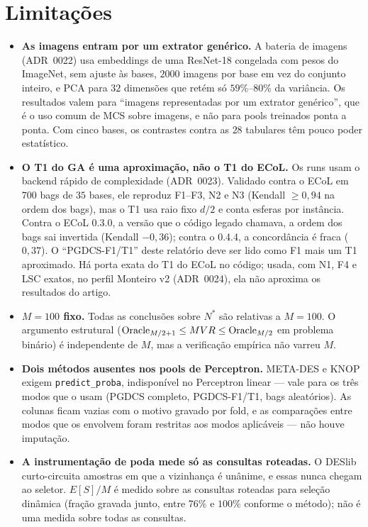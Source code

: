 \section{Limitações}

\begin{itemize}
\item \textbf{As imagens entram por um extrator genérico.} A bateria de imagens
(ADR~0022) usa embeddings de uma ResNet-18 congelada com pesos do ImageNet, sem
ajuste às bases, $2000$ imagens por base em vez do conjunto inteiro, e PCA para
$32$ dimensões que retém só $59\%$--$80\%$ da variância. Os resultados valem para
``imagens representadas por um extrator genérico'', que é o uso comum de MCS
sobre imagens, e não para pools treinados ponta a ponta. Com cinco bases, os
contrastes contra as $28$ tabulares têm pouco poder estatístico.

\item \textbf{O T1 do GA é uma aproximação, não o T1 do ECoL.} Os runs usam o
backend rápido de complexidade (ADR~0023). Validado contra o ECoL em $700$ bags
de $35$ bases, ele reproduz F1--F3, N2 e N3 (Kendall $\ge0{,}94$ na ordem dos
bags), mas o T1 usa raio fixo $d/2$ e conta esferas por instância. Contra o ECoL
0.3.0, a versão que o código legado chamava, a ordem dos bags sai invertida
(Kendall $-0{,}36$); contra o 0.4.4, a concordância é fraca ($0{,}37$). O
``PGDCS-F1/T1'' deste relatório deve ser lido como F1 mais um T1 aproximado. Há
porta exata do T1 do ECoL no código; usada, com N1, F4 e LSC exatos, no perfil
Monteiro v2 (ADR~0024), ela não aproxima os resultados do artigo.

\item \textbf{$M=100$ fixo.} Todas as conclusões sobre $N^{*}$ são relativas a
$M=100$. O argumento estrutural ($\text{Oracle}_{M/2+1}\le MVR\le\text{Oracle}_{M/2}$ em problema binário)
é independente de $M$, mas a verificação empírica não varreu $M$.

\item \textbf{Dois métodos ausentes nos pools de Perceptron.} META-DES e KNOP
exigem \texttt{predict\_proba}, indisponível no Perceptron linear --- vale para os
três modos que o usam (PGDCS completo, PGDCS-F1/T1, bags aleatórios). As colunas
ficam vazias com o motivo gravado por fold, e as comparações entre modos que os
envolvem foram restritas aos modos aplicáveis --- não houve imputação.

\item \textbf{A instrumentação de poda mede só as consultas roteadas.} O DESlib
curto-circuita amostras em que a vizinhança é unânime, e essas nunca chegam ao
seletor. $E[S]/M$ é medido sobre as consultas roteadas para seleção dinâmica
(fração gravada junto, entre $76\%$ e $100\%$ conforme o método); não é uma medida
sobre todas as consultas.


\end{itemize}
